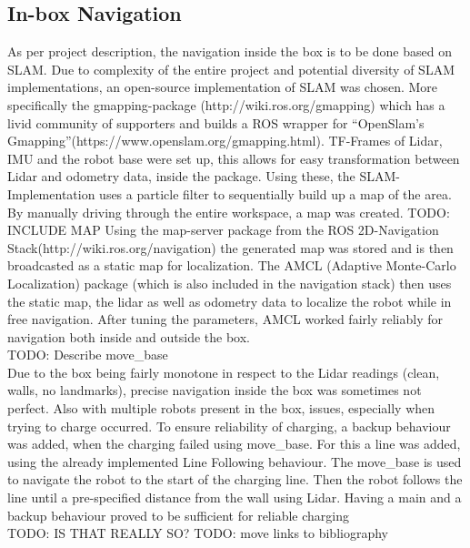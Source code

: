 \subsection{In-box Navigation} \label{sec:in_box_navigation}
As per project description, the navigation inside the box is to be done based on SLAM. Due to complexity of the entire project and potential diversity of SLAM implementations, an open-source implementation of SLAM was chosen. More specifically the gmapping-package (http://wiki.ros.org/gmapping) which has a livid community of supporters and builds a ROS wrapper for “OpenSlam's Gmapping”(https://www.openslam.org/gmapping.html). TF-Frames of Lidar, IMU and the robot base were set up, this allows for easy transformation between Lidar and odometry data, inside the package. Using these, the SLAM-Implementation uses a particle filter to sequentially build up a map of the area. By manually driving through the entire workspace, a map was created. 
TODO: INCLUDE MAP
Using the map-server package from the ROS 2D-Navigation Stack(http://wiki.ros.org/navigation) the generated map was stored and is then broadcasted as a static map for localization. The AMCL (Adaptive Monte-Carlo Localization) package (which is also included in the navigation stack) then uses the static map, the lidar as well as odometry data to localize the robot while in free navigation. After tuning the parameters, AMCL worked fairly reliably for navigation both inside and outside the box.\\
TODO: Describe move{\_}base\\
Due to the box being fairly monotone in respect to the Lidar readings (clean, walls, no landmarks), precise navigation inside the box was sometimes not perfect. Also with multiple robots present in the box, issues, especially when trying to charge occurred. To ensure reliability of charging, a backup behaviour was added, when the charging failed using move{\_}base. For this a line was added, using the already implemented Line Following behaviour. The move{\_}base is used to navigate the robot to the start of the charging line. Then the robot follows the line until a pre-specified distance from the wall using Lidar. Having a main and a backup behaviour proved to be sufficient for reliable charging\\
TODO: IS THAT REALLY SO?
TODO: move links to bibliography